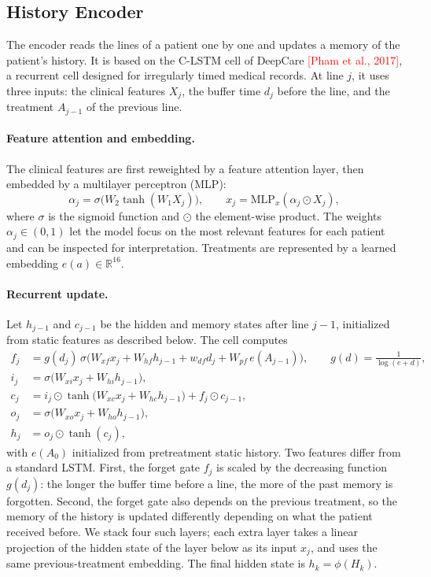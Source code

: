 \documentclass[a4paper,10pt]{article}
\newcommand{\todo}[1]{\textcolor{red}{#1}}
\begin{document}
\subsection{History Encoder}
\label{sec:encoder}

The encoder reads the lines of a patient one by one and updates a memory of the patient's history. It is based on the C-LSTM cell of DeepCare \todo{[Pham et al., 2017]}, a recurrent cell designed for irregularly timed medical records. At line $j$, it uses three inputs: the clinical features $X_j$, the buffer time $d_j$ before the line, and the treatment $A_{j-1}$ of the previous line.

\paragraph{Feature attention and embedding.} The clinical features are first reweighted by a feature attention layer, then embedded by a multilayer perceptron (MLP):
\begin{equation}
    \alpha_j = \sigma\big(W_2 \tanh(W_1 X_j)\big), \qquad x_j = \text{MLP}_x(\alpha_j \odot X_j),
\end{equation}
where $\sigma$ is the sigmoid function and $\odot$ the element-wise product. The weights $\alpha_j \in (0,1)$ let the model focus on the most relevant features for each patient and can be inspected for interpretation. Treatments are represented by a learned embedding $e(a) \in \mathbb{R}^{16}$.

\paragraph{Recurrent update.} Let $h_{j-1}$ and $c_{j-1}$ be the hidden and memory states after line $j-1$, initialized from static features as described below. The cell computes
\begin{align}
    f_j &= g(d_j)\, \sigma\big(W_{xf} x_j + W_{hf} h_{j-1} + w_{df} d_j + W_{pf}\, e(A_{j-1})\big), \qquad g(d) = \frac{1}{\log(e + d)}, \\
    i_j &= \sigma\big(W_{xi} x_j + W_{hi} h_{j-1}\big), \\
    c_j &= i_j \odot \tanh\big(W_{xc} x_j + W_{hc} h_{j-1}\big) + f_j \odot c_{j-1}, \\
    o_j &= \sigma\big(W_{xo} x_j + W_{ho} h_{j-1}\big), \\
    h_j &= o_j \odot \tanh(c_j),
\end{align}
with $e(A_0)$ initialized from pretreatment static history. Two features differ from a standard LSTM. First, the forget gate $f_j$ is scaled by the decreasing function $g(d_j)$: the longer the buffer time before a line, the more of the past memory is forgotten. Second, the forget gate also depends on the previous treatment, so the memory of the history is updated differently depending on what the patient received before. We stack four such layers; each extra layer takes a linear projection of the hidden state of the layer below as its input $x_j$, and uses the same previous-treatment embedding. The final hidden state is $h_k = \phi(H_k)$.
\end{document}
